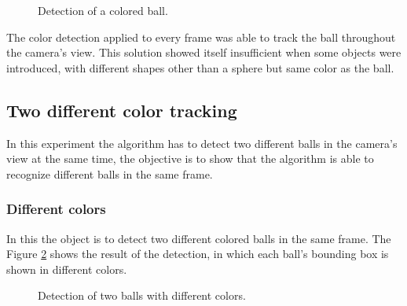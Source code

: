 \documentclass[10pt,twocolumn,letterpaper]{article}
\begin{document}
\begin{figure}[!h]
\centering
\setlength{\fboxsep}{1pt}
\setlength{\fboxrule}{1pt}
\caption{Detection of a colored ball.}\label{fig:single_color}
\end{figure}

The color detection applied to every frame was able to track the ball throughout the camera's view. This solution showed itself insufficient when some objects were introduced, with different shapes other than a sphere but same color as the ball.

\subsection{Two different color tracking}

In this experiment the algorithm has to detect two different balls in the camera's view at the same time, the objective is to show that the algorithm is able to recognize different balls in the same frame.

\subsubsection{Different colors}

In this the object is to detect two different colored balls in the same frame. The Figure \ref{fig:diff_color} shows the result of the detection, in which each ball's  bounding box is shown in different colors.

\begin{figure}[!h]
\centering
\setlength{\fboxsep}{1pt}
\setlength{\fboxrule}{1pt}
\caption{Detection of two balls with different colors.}\label{fig:diff_color}
\end{figure}
\end{document}
